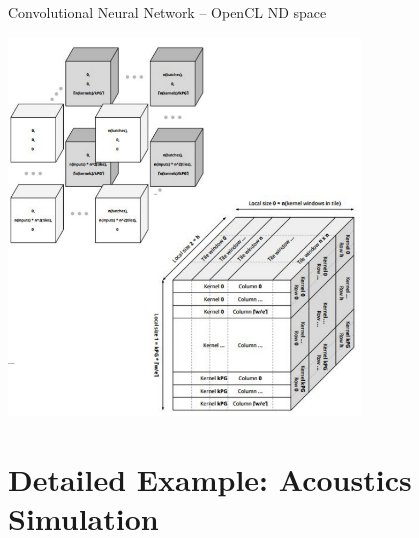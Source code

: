 \documentclass[10pt]{beamer}
\begin{document}

\begin{frame}{Convolutional Neural Network -- OpenCL ND space}
\vspace{-1.5cm}
    \begin{block}{}
        \begin{center}
            \includegraphics[width=0.7\textwidth]{../images/conv_nd.pdf}
        \end{center}
    \end{block}
\vspace{-1.2cm}
\end{frame}

\section{Detailed Example: Acoustics Simulation }
\end{document}
